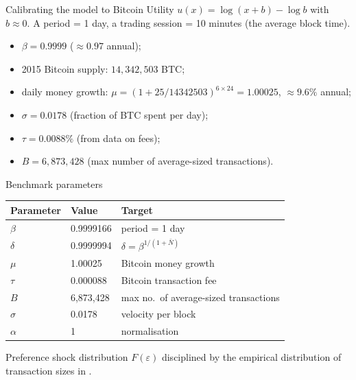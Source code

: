 \documentclass[aspectratio=169,xcolor=dvipsnames]{beamer}
\begin{document}
\begin{frame}{Calibrating the model to Bitcoin}
    Utility $u(x) = \log(x+b) - \log b$ with $b\approx 0$.
    A period = 1 day, a trading session = 10 minutes (the average block time).
    \vspace{2mm}
    \begin{itemize}
        \item $\beta = 0.9999$ ($\approx 0.97$ annual);
        \item 2015 Bitcoin supply: $14{,}342{,}503$ BTC;
        \item daily money growth: $\mu = (1 + 25/14342503)^{6\times 24} = 1.00025$, $\approx 9.6\%$ annual;
        \item $\sigma = 0.0178$ (fraction of BTC spent per day);
        \item $\tau = 0.0088\%$ (from data on fees);
        \item $B = 6{,}873{,}428$ (max number of average-sized transactions).
    \end{itemize}
\end{frame}

\begin{frame}{Benchmark parameters}
    \centering
    \footnotesize
    \begin{tabular}{lll}
        \hline
        Parameter & Value & Target \\
        \hline
        $\beta$ & 0.9999166 & period = 1 day \\
        $\delta$ & 0.9999994 & $\delta = \beta^{1/(1+\bar N)}$ \\
        $\mu$ & 1.00025 & Bitcoin money growth \\
        $\tau$ & 0.000088 & Bitcoin transaction fee \\
        $B$ & 6{,}873{,}428 & max no.\ of average-sized transactions \\
        $\sigma$ & 0.0178 & velocity per block \\
        $\alpha$ & 1 & normalisation \\
        \hline
    \end{tabular}
    \vspace{4mm}

    Preference shock distribution $F(\varepsilon)$ disciplined by the empirical distribution
    of transaction sizes in \citet{ron2013}.
\end{frame}
\end{document}
